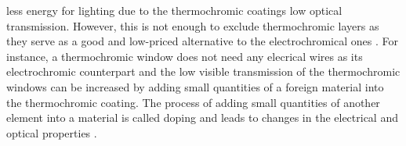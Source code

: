 less energy for lighting due to the thermochromic coatings low optical transmission.
However, 
this is not enough to exclude thermochromic layers
as they serve as a good and low-priced alternative to the electrochromical ones \cite{Mlyuka2009}.
For instance, a thermochromic window does not need any 
elecrical wires as its electrochromic counterpart and the low visible transmission of the
thermochromic windows can be increased by adding small quantities of a foreign material 
into the thermochromic coating. The process of adding small quantities of another element 
into a material is called doping and leads to changes in the electrical and optical properties 
\cite[p.~39]{Kanu2010}. 




